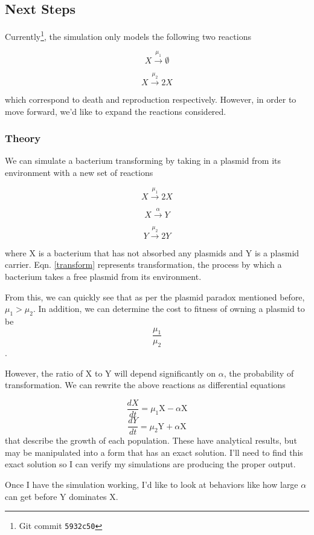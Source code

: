 \documentclass[oneside]{labbook}
\newcommand{\commit}[1]{\footnote{Git commit \texttt{#1}}}
\newcommand{\reaction}[4][]{
  \begin{equation}
  #2 \overset{#4}{\rightarrow} #3
  \end{equation}}
\newcommand{\lreaction}[4]{
  \begin{equation}
  \label{#1}
  #2 \overset{#4}{\rightarrow} #3
  \end{equation}}
\begin{document}
\subsection*{Next Steps}

Currently\commit{5932c50}, the simulation only models the following two reactions

\reaction{X}{\emptyset}{\mu_1}
\reaction{X}{2X}{\mu_2}

which correspond to death and reproduction respectively. However, in order to
move forward, we'd like to expand the reactions considered.

\subsubsection{Theory}

We can simulate a bacterium transforming by taking in a plasmid from its
environment with a new set of reactions

\lreaction{xbirth}{X}{2X}{\mu_1}
\lreaction{transform}{X}{Y}{\alpha}
\reaction{Y}{2Y}{\mu_2}

where X is a bacterium that has not absorbed any plasmids and Y is a plasmid
carrier. Eqn. \ref{transform} represents transformation, the
process by which a bacterium takes a free plasmid from its environment.

From this, we can quickly see that as per the plasmid paradox mentioned before,
$\mu_1 > \mu_2$. In addition, we can determine the cost to fitness of owning a
plasmid to be
\begin{equation}
\frac{\mu_1}{\mu_2}
\end{equation}.

However, the ratio of X to Y will depend significantly on $\alpha$, the probability
of transformation. We can rewrite the above reactions as differential equations

\begin{equation}
  \frac{dX}{dt} = \mu_1 \text{X} - \alpha \text{X}
\end{equation}
\begin{equation}
  \frac{dY}{dt} = \mu_2 \text{Y} + \alpha \text{X}
\end{equation}
that describe the growth of each population. These have analytical results, but
may be manipulated into a form that has an exact solution. I'll need to find this
exact solution so I can verify my simulations are producing the proper output.

Once I have the simulation working, I'd like to look at behaviors like how large
$\alpha$ can get before Y dominates X.
\end{document}
